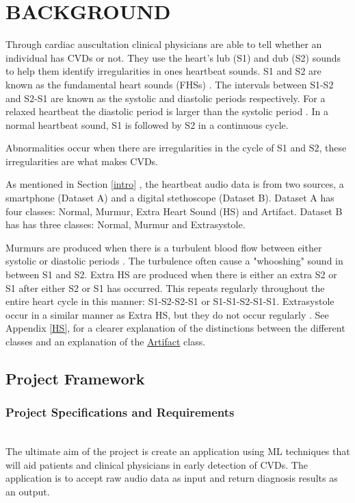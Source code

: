 \documentclass[10pt,twocolumn]{witseiepaper}
\begin{document}

\section{BACKGROUND}
\label{back}
Through cardiac auscultation clinical physicians are able to tell whether an individual has CVDs or not. They use the heart's lub (S1) and dub (S2) sounds to help them identify irregularities in ones heartbeat sounds. S1 and S2 are known as the fundamental heart sounds (FHSs) \cite{54}. The intervals between S1-S2 and S2-S1 are known as the systolic and diastolic periods respectively. For a relaxed heartbeat the diastolic period is larger than the systolic period \cite{orient2010sapira}. In a normal heartbeat sound, S1 is followed by S2 in a continuous cycle.

Abnormalities occur when there are irregularities in the cycle of S1 and S2, these irregularities are what makes CVDs. 

As mentioned in Section \ref{intro} , the heartbeat audio data is from two sources, a smartphone (Dataset A) and a digital stethoscope (Dataset B). Dataset A has four classes: Normal, Murmur, Extra Heart Sound (HS) and Artifact. Dataset B has has three classes: Normal, Murmur and Extrasystole. 

Murmurs are produced when there is a turbulent blood flow between either systolic or diastolic periods \cite{35}. The turbulence often cause a "whooshing" sound in between S1 and S2. Extra HS are produced when there is either an extra S2 or S1 after either S2 or S1 has occurred. This repeats regularly throughout the entire heart cycle in this manner: S1-S2-S2-S1 or S1-S1-S2-S1-S1. Extrasystole occur in a similar manner as Extra HS, but they do not occur regularly \cite{bentley}. See Appendix \ref{HS}, for a clearer explanation of the distinctions between the different classes and an explanation of the \hyperref[sec:arti]{Artifact} class.

\subsection{Project Framework}
\subsubsection{Project Specifications and Requirements}
\label{sec:req}
\textcolor{white}{Ke a leboga Ntate}\\
The ultimate aim of the project is create an application using ML techniques that will aid patients and clinical physicians in early detection of CVDs. The application is to accept raw audio data as input and return diagnosis results as an output.
\end{document}
